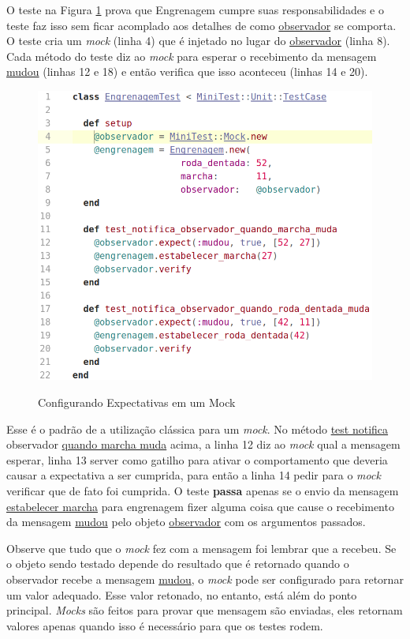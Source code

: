 O teste na Figura \ref{img:codigo_pag_217} prova que Engrenagem cumpre suas responsabilidades e o teste faz isso sem ficar acomplado aos detalhes de como \underline{observador} se comporta. O teste cria um \textit{mock} (linha 4) que é injetado no lugar do \underline{observador} (linha 8). Cada método do teste diz ao \textit{mock} para esperar o recebimento da mensagem \underline{mudou} (linhas 12 e 18) e então verifica que isso aconteceu (linhas 14 e 20).

\begin{figure}[!htbp]
  \center
  \caption{Configurando Expectativas em um Mock}
  \includegraphics[scale=0.50]{imagens/codigo_pag_217.png}
  \label{img:codigo_pag_217}
\end{figure}

Esse é o padrão de a utilização clássica para um \textit{mock}. No método \underline{test notifica} observador \underline{quando marcha muda} acima, a linha 12 diz ao \textit{mock} qual a mensagem esperar, linha 13 server como gatilho para ativar o comportamento que deveria causar a expectativa a ser cumprida, para então a linha 14 pedir para o \textit{mock} verificar que de fato foi cumprida. O teste \textbf{passa} apenas se o envio da mensagem \underline{estabelecer marcha} para engrenagem fizer alguma coisa que cause o recebimento da mensagem \underline{mudou} pelo objeto \underline{observador} com os argumentos passados.

Observe que tudo que o \textit{mock} fez com a mensagem foi lembrar que a recebeu. Se o objeto sendo testado depende do resultado que é retornado quando o observador recebe a mensagem \underline{mudou}, o \textit{mock} pode ser configurado para retornar um valor adequado. Esse valor retonado, no entanto, está além do ponto principal. \textit{Mocks} são feitos para provar que mensagem são enviadas, eles retornam valores apenas quando isso é necessário para que os testes rodem.

